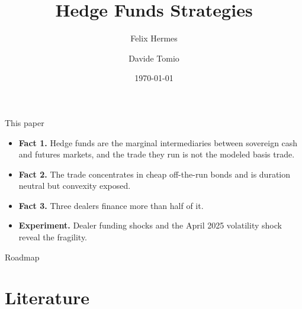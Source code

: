\documentclass[aspectratio=169,11pt]{beamer}
\title{Hedge Funds Strategies}
\author{Felix Hermes \and Davide Tomio}
\date{\today}
\begin{document}
\begin{frame}
  \titlepage
\end{frame}

\begin{frame}{This paper}
  \begin{itemize}
    \item \textbf{Fact 1.} Hedge funds are the marginal intermediaries between sovereign cash and futures markets, and the trade they run is not the modeled basis trade.
    \item \textbf{Fact 2.} The trade concentrates in cheap off-the-run bonds and is duration neutral but convexity exposed.
    \item \textbf{Fact 3.} Three dealers finance more than half of it.
    \item \textbf{Experiment.} Dealer funding shocks and the April 2025 volatility shock reveal the fragility.
  \end{itemize}
\end{frame}

\begin{frame}{Roadmap}
  \tableofcontents[hideallsubsections]
\end{frame}

\section{Literature}
\end{document}

